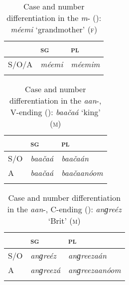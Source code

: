 \begin{table}[p]
\caption{Case and number differentiation in the \textit{m}- (): \textit{méemi} `grandmother' \textsc{(f)}}
\begin{tabularx}{\textwidth}{ Q Q Q }
\lsptoprule
&
\textsc{sg} &
\textsc{pl}\\\midrule
S/O/A &
\textit{méemi} &
\textit{méemim} \\\lspbottomrule
\end{tabularx}
\label{tab:11-mdecl}
\end{table}


\begin{table}[p]
\caption{Case and number differentiation in the \textit{aan}-, V-ending (): \textit{baačaá} `king' \textsc{(m)}}
\begin{tabularx}{\textwidth}{ Q Q Q }
\lsptoprule
&
\textsc{sg} &
\textsc{pl}\\\midrule
S/O &
\textit{baačaá} &
\textit{baačaán} \\
A &
\textit{baačaá} &
\textit{baačaanóom} \\\lspbottomrule
\end{tabularx}
\label{tab:11-aanvdecl}
\end{table}

\begin{table}[p]
\caption{Case and number differentiation in the \textit{aan}-, C-ending (): \textit{anɡreéz} `Brit' \textsc{(m)}}
\begin{tabularx}{\textwidth}{ Q Q Q }
\lsptoprule
&
\textsc{sg} &
\textsc{pl}\\\midrule
S/O &
\textit{anɡreéz} &
\textit{anɡreezaán} \\
A &
\textit{anɡreezá} &
\textit{anɡreezaanóom} \\\lspbottomrule
\end{tabularx}
\label{tab:11-aancdecl}
\end{table}



